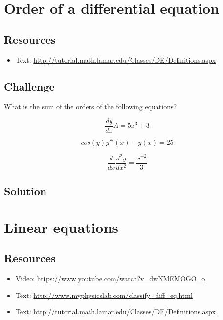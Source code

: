 \section{Order of a differential equation}

\subsection*{Resources}
\begin{itemize}
    \item Text: \url{http://tutorial.math.lamar.edu/Classes/DE/Definitions.aspx}
\end{itemize}

\subsection*{Challenge}
What is the sum of the orders of the following equations?

\begin{equation}
    \frac{dy}{dx}A = 5x^3 + 3
\end{equation}

\begin{equation}
    cos(y) y'''(x) - y(x) = 25
\end{equation}

\begin{equation}
    \frac{d}{dx} \frac{d^2 y}{dx^2} = \frac{x^{-2}}{3}
\end{equation}

\subsection*{Solution}
\six{}





\newpage

\section{Linear equations}

\subsection*{Resources}
\begin{itemize}
    \item Video: \url{https://www.youtube.com/watch?v=dwNMEMOGO_o}
    \item Text: \url{http://www.myphysicslab.com/classify_diff_eq.html}
    \item Text: \url{http://tutorial.math.lamar.edu/Classes/DE/Definitions.aspx}
\end{itemize}

